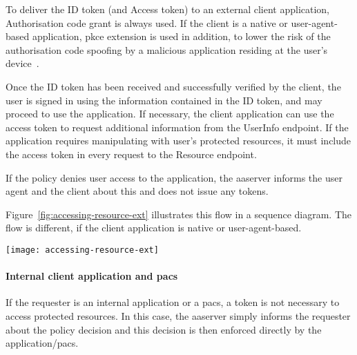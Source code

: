 To deliver the ID token (and Access token) to an external client application, Authorisation code grant is always used. If the client is a native or user-agent-based application, \acrshort{pkce} extension is used in addition, to lower the risk of the authorisation code spoofing by a malicious application residing at the user's device~\cite{Sakimura2015ProofClients}.

Once the ID token has been received and successfully verified by the client, the user is signed in using the information contained in the ID token, and may proceed to use the application. If necessary, the client application can use the access token to request additional information from the UserInfo endpoint. If the application requires manipulating with user's protected resources, it must include the access token in every request to the Resource endpoint.

If the policy denies user access to the application, the \acrshort{aaserver} informs the user agent and the client about this and does not issue any tokens.

Figure~\ref{fig:accessing-resource-ext} illustrates this flow in a sequence diagram. The flow is different, if the client application is native or user-agent-based.

\begin{sidewaysfigure}[p]
    \centering
    \texttt{[image: accessing-resource-ext]}
    \caption{Sign-in and access token issuance process to external server-based client application.}
    \label{fig:accessing-resource-ext}
\end{sidewaysfigure}
\restoregeometry

\paragraph{Internal client application and \acrshort{pacs}}
If the requester is an internal application or a \acrshort{pacs}, a token is not necessary to access protected resources. In this case, the \acrshort{aaserver} simply informs the requester about the policy decision and this decision is then enforced directly by the application/\acrshort{pacs}.

